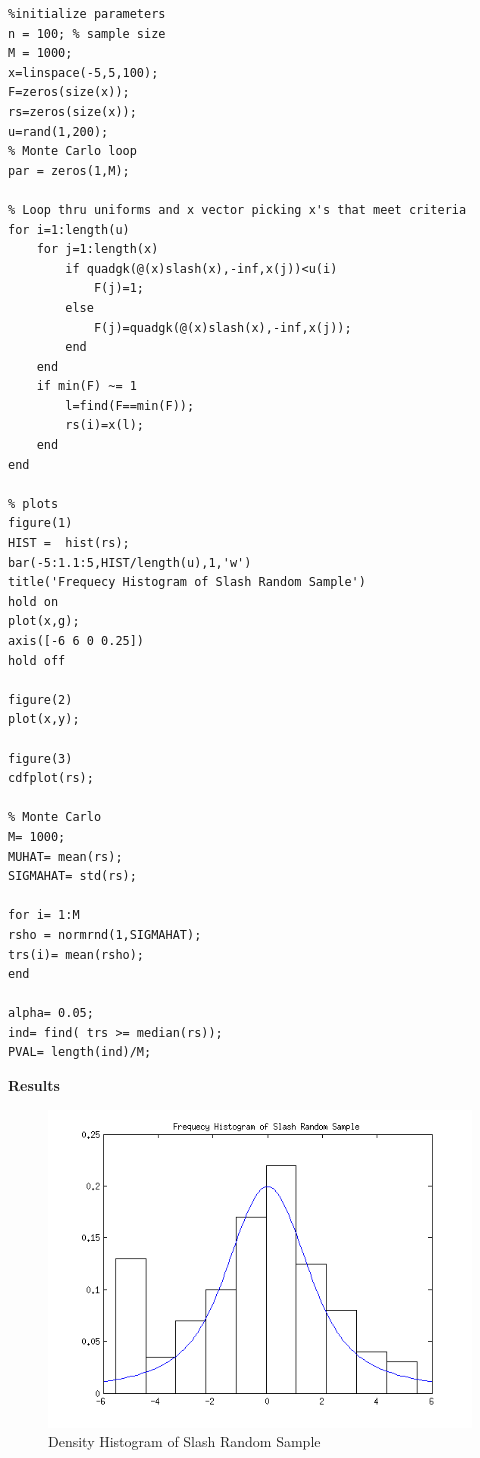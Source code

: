 \documentclass[12pt,a4paper]{article}
\begin{document}
\begin{verbatim}
%initialize parameters
n = 100; % sample size
M = 1000;
x=linspace(-5,5,100);
F=zeros(size(x));
rs=zeros(size(x));
u=rand(1,200);
% Monte Carlo loop
par = zeros(1,M);

% Loop thru uniforms and x vector picking x's that meet criteria
for i=1:length(u)
    for j=1:length(x)
        if quadgk(@(x)slash(x),-inf,x(j))<u(i)
            F(j)=1;
        else
            F(j)=quadgk(@(x)slash(x),-inf,x(j));
        end
    end
    if min(F) ~= 1
        l=find(F==min(F));
        rs(i)=x(l);
    end
end

% plots
figure(1)
HIST =  hist(rs);
bar(-5:1.1:5,HIST/length(u),1,'w')
title('Frequecy Histogram of Slash Random Sample')
hold on
plot(x,g);
axis([-6 6 0 0.25])
hold off

figure(2)
plot(x,y);

figure(3)
cdfplot(rs);

% Monte Carlo
M= 1000;
MUHAT= mean(rs);
SIGMAHAT= std(rs);

for i= 1:M
rsho = normrnd(1,SIGMAHAT);
trs(i)= mean(rsho);
end

alpha= 0.05;
ind= find( trs >= median(rs));
PVAL= length(ind)/M;
\end{verbatim}

\textbf{Results}

\begin{figure}[ht!]
\begin{center}
\includegraphics[scale=.9]{q1_density.png}
\caption{Density Histogram of Slash Random Sample}
\label{q1 fig1}
\end{center}
\end{figure}
\FloatBarrier
\end{document}
